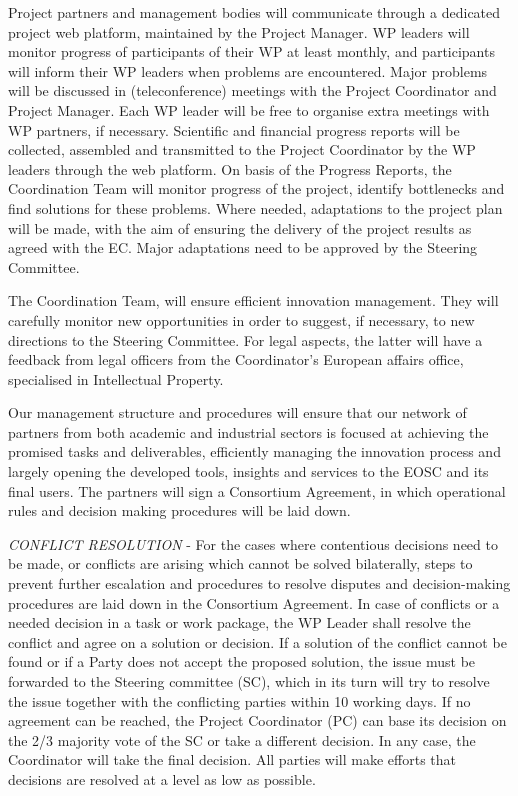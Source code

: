 Project partners and management bodies will communicate through
a dedicated project web platform, maintained by the Project
Manager. WP leaders will monitor progress of
participants of their WP at least monthly, and participants will inform their WP
leaders when problems are encountered. Major problems will be
discussed in (teleconference) meetings with the Project Coordinator
and Project Manager. Each WP leader will be free to organise
extra meetings with WP partners, if necessary. Scientific and
financial progress reports will be collected, assembled and
transmitted to the Project Coordinator by the WP leaders through the
web platform. On basis of the Progress Reports, the Coordination Team
will monitor progress of the project, identify bottlenecks and find
solutions for these problems. Where needed, adaptations to the project
plan will be made, with the aim of ensuring the delivery of the project
results as agreed with the EC. Major adaptations need to be approved
by the Steering Committee.

The Coordination Team, will ensure efficient innovation management.
They will carefully monitor new opportunities in order to suggest, if
necessary, to new directions to the Steering Committee. For legal
aspects, the latter will have a feedback from legal officers from the
Coordinator's European affairs office,
specialised in Intellectual Property.

Our management structure and procedures will ensure that our network
of partners from both academic and industrial sectors is focused at
achieving the promised tasks and deliverables, efficiently managing
the innovation process and largely opening the developed tools,
insights and services to the EOSC and its final users.
The partners will sign a Consortium Agreement, in which operational
rules and decision making procedures will be laid down.

\emph{CONFLICT RESOLUTION} - For the cases where contentious decisions
need to be made, or conflicts are arising which cannot be solved bilaterally,
steps to prevent further escalation and procedures to resolve disputes
and decision-making procedures are laid down in the Consortium Agreement.
In case of conflicts or a needed decision in a task or work package,
the WP Leader shall resolve the conflict and agree on a solution or decision.
If a solution of the conflict cannot be found or if a Party does not accept
the proposed solution, the issue must be forwarded to the Steering committee (SC),
which in its turn will try to resolve the issue together with the conflicting parties
within 10 working days. If no agreement can be reached, the Project Coordinator (PC) can
base its decision on the 2/3 majority vote of the SC or take a different decision.
In any case, the Coordinator will take the final decision. All parties will make
efforts that decisions are resolved at a level as low as possible.


